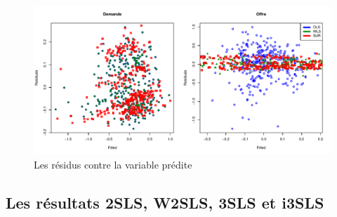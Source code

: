 \documentclass[11pt,]{article}
\begin{document}
\begin{figure}[!htbp]

{\centering \includegraphics{note2pres_files/figure-latex/unnamed-chunk-48-1} 

}

\caption{Les résidus contre la variable prédite}\label{fig:unnamed-chunk-48}
\end{figure}

\FloatBarrier

\hypertarget{les-resultats-2sls-w2sls-3sls-et-i3sls}{%
\subsection{Les résultats 2SLS, W2SLS, 3SLS et
i3SLS}\label{les-resultats-2sls-w2sls-3sls-et-i3sls}}

\FloatBarrier

\FloatBarrier
\end{document}
